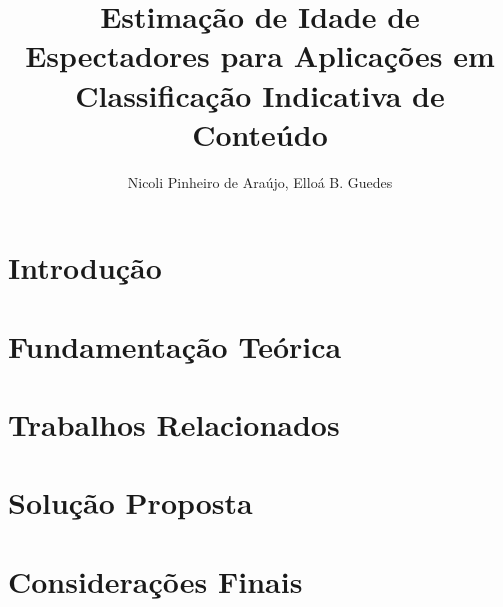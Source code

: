 \documentclass[12pt]{article}
\title{Estimação de Idade de Espectadores para Aplicações em Classificação Indicativa de Conteúdo}
\author{Nicoli Pinheiro de Araújo, Elloá B. Guedes}
\begin{document}

\maketitle



\section{Introdução}\label{sec:intro}


\section{Fundamentação Teórica}\label{sec:fund_teorica}


\section{Trabalhos Relacionados}\label{sec:trab_relac}


\section{Solução Proposta}\label{sec:solucao_proposta}


\section{Considerações Finais}\label{sec:consid_finais}




\end{document}
